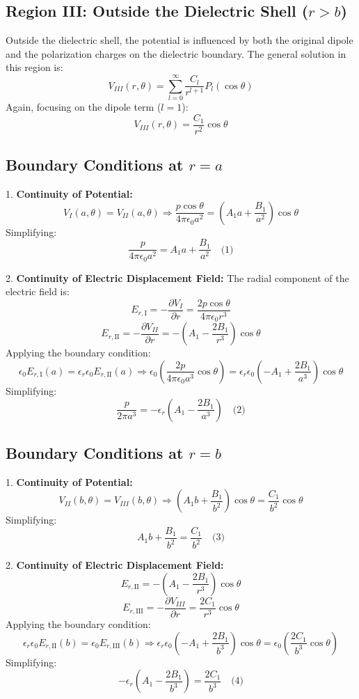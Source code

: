 \documentclass[12pt]{article}
\begin{document}
\subsection*{Region III: Outside the Dielectric Shell (\(r > b\))}

Outside the dielectric shell, the potential is influenced by both the original dipole and the polarization charges on the dielectric boundary. The general solution in this region is:
\[
V_{III}(r, \theta) = \sum_{l=0}^{\infty} \frac{C_l}{r^{l+1}} P_l(\cos \theta)
\]
Again, focusing on the dipole term (\(l = 1\)):
\[
V_{III}(r, \theta) = \frac{C_1}{r^2} \cos \theta
\]

\subsection*{Boundary Conditions at \(r = a\)}

1. \textbf{Continuity of Potential:}
\[
V_I(a, \theta) = V_{II}(a, \theta) \Rightarrow \frac{p \cos \theta}{4\pi \epsilon_0 a^2} = \left( A_1 a + \frac{B_1}{a^2} \right) \cos \theta
\]
Simplifying:
\[
\frac{p}{4\pi \epsilon_0 a^2} = A_1 a + \frac{B_1}{a^2} \quad \text{(1)}
\]

2. \textbf{Continuity of Electric Displacement Field:}
The radial component of the electric field is:
\[
E_{r, \text{I}} = -\frac{\partial V_I}{\partial r} = \frac{2p \cos \theta}{4\pi \epsilon_0 r^3}
\]
\[
E_{r, \text{II}} = -\frac{\partial V_{II}}{\partial r} = -\left( A_1 - \frac{2B_1}{r^3} \right) \cos \theta
\]
Applying the boundary condition:
\[
\epsilon_0 E_{r, \text{I}}(a) = \epsilon_r \epsilon_0 E_{r, \text{II}}(a) \Rightarrow \epsilon_0 \left( \frac{2p}{4\pi \epsilon_0 a^3} \cos \theta \right) = \epsilon_r \epsilon_0 \left( -A_1 + \frac{2B_1}{a^3} \right) \cos \theta
\]
Simplifying:
\[
\frac{p}{2\pi a^3} = -\epsilon_r \left( A_1 - \frac{2B_1}{a^3} \right) \quad \text{(2)}
\]

\subsection*{Boundary Conditions at \(r = b\)}

1. \textbf{Continuity of Potential:}
\[
V_{II}(b, \theta) = V_{III}(b, \theta) \Rightarrow \left( A_1 b + \frac{B_1}{b^2} \right) \cos \theta = \frac{C_1}{b^2} \cos \theta
\]
Simplifying:
\[
A_1 b + \frac{B_1}{b^2} = \frac{C_1}{b^2} \quad \text{(3)}
\]

2. \textbf{Continuity of Electric Displacement Field:}
\[
E_{r, \text{II}} = -\left( A_1 - \frac{2B_1}{r^3} \right) \cos \theta
\]
\[
E_{r, \text{III}} = -\frac{\partial V_{III}}{\partial r} = \frac{2C_1}{r^3} \cos \theta
\]
Applying the boundary condition:
\[
\epsilon_r \epsilon_0 E_{r, \text{II}}(b) = \epsilon_0 E_{r, \text{III}}(b) \Rightarrow \epsilon_r \epsilon_0 \left( -A_1 + \frac{2B_1}{b^3} \right) \cos \theta = \epsilon_0 \left( \frac{2C_1}{b^3} \cos \theta \right)
\]
Simplifying:
\[
-\epsilon_r \left( A_1 - \frac{2B_1}{b^3} \right) = \frac{2C_1}{b^3} \quad \text{(4)}
\]
\end{document}

